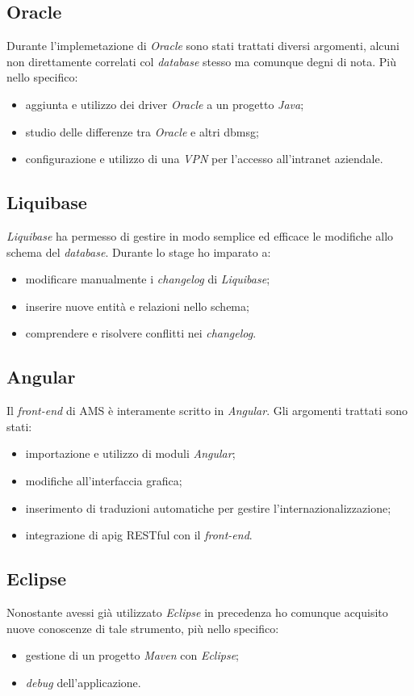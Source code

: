 \subsection{Oracle}
Durante l'implemetazione di \textit{Oracle} sono stati trattati diversi argomenti, alcuni non direttamente correlati col \textit{database} stesso ma comunque degni di nota. Più nello specifico:
\begin{itemize}
    \item aggiunta e utilizzo dei driver \textit{Oracle} a un progetto \textit{Java};
    \item studio delle differenze tra \textit{Oracle} e altri \gls{dbmsg};
    \item configurazione e utilizzo di una \textit{VPN} per l'accesso all'intranet aziendale.
\end{itemize}

\subsection{Liquibase}
\textit{Liquibase} ha permesso di gestire in modo semplice ed efficace le modifiche allo schema del \textit{database}. Durante lo stage ho imparato a:
\begin{itemize}
    \item modificare manualmente i \textit{changelog} di \textit{Liquibase};
    \item inserire nuove entità e relazioni nello schema;
    \item comprendere e risolvere conflitti nei \textit{changelog}.
\end{itemize}

\subsection{Angular}
Il \textit{front-end} di AMS è interamente scritto in \textit{Angular}. Gli argomenti trattati sono stati:
\begin{itemize}
    \item importazione e utilizzo di moduli \textit{Angular};
    \item modifiche all'interfaccia grafica;
    \item inserimento di traduzioni automatiche per gestire l'internazionalizzazione;
    \item integrazione di \gls{apig} RESTful con il \textit{front-end}.
\end{itemize}

\subsection{Eclipse}
Nonostante avessi già utilizzato \textit{Eclipse} in precedenza ho comunque acquisito nuove conoscenze di tale strumento, più nello specifico:
\begin{itemize}
    \item gestione di un progetto \textit{Maven} con \textit{Eclipse};
    \item \textit{debug} dell'applicazione.
\end{itemize}

